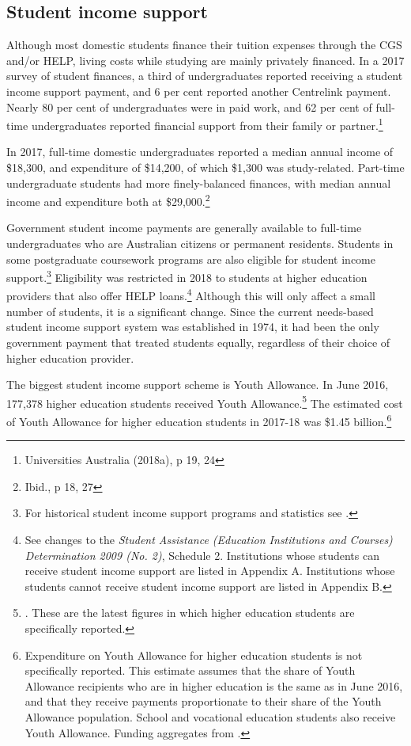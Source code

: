\documentclass{grattan}
\begin{document}
%
\subsection{Student income support}\label{subsec:student-income-support}

Although most domestic students finance their tuition expenses through the CGS and/or HELP, living costs while studying are mainly privately financed. In a 2017 survey of student finances, a third of undergraduates reported receiving a student income support payment, and 6 per cent reported another Centrelink payment. Nearly 80 per cent of undergraduates were in paid work, and 62 per cent of full-time undergraduates reported financial support from their family or partner.\footnote{Universities Australia (2018a), p 19, 24}

In 2017, full-time domestic undergraduates reported a median annual income of \$18,300, and expenditure of \$14,200, of which \$1,300 was study-related. Part-time undergraduate students had more finely-balanced finances, with median annual income and expenditure both at \$29,000.\footnote{Ibid., p 18, 27}

Government student income payments are generally available to full-time undergraduates who are Australian citizens or permanent residents. Students in some postgraduate coursework programs are also eligible for student income support.\footnote{For historical student income support programs and statistics see \textcite[][]{Daniels2017studentincomesupp}.} Eligibility was restricted in 2018 to students at higher education providers that also offer HELP loans.\footnote{See changes to the \emph{Student Assistance (Education Institutions and Courses) Determination 2009 (No. 2)}, Schedule 2. Institutions whose students can receive student income support are listed in Appendix A. Institutions whose students cannot receive student income support are listed in Appendix B.} Although this will only affect a small number of students, it is a significant change. Since the current needs-based student income support system was established in 1974, it had been the only government payment that treated students equally, regardless of their choice of higher education provider.

The biggest student income support scheme is Youth Allowance. In June 2016, 177,378 higher education students received Youth Allowance.\footnote{\textcite[][]{DepartmentofSocialServices2017youthallowancest}. These are the latest figures in which higher education students are specifically reported.} The estimated cost of Youth Allowance for higher education students in 2017-18 was \$1.45 billion.\footnote{Expenditure on Youth Allowance for higher education students is not specifically reported. This estimate assumes that the share of Youth Allowance recipients who are in higher education is the same as in June 2016, and that they receive payments proportionate to their share of the Youth Allowance population. School and vocational education students also receive Youth Allowance. Funding aggregates from \textcite[][47]{DepartmentofSocialServices2018porfoliobudgetsta}.}
\end{document}
